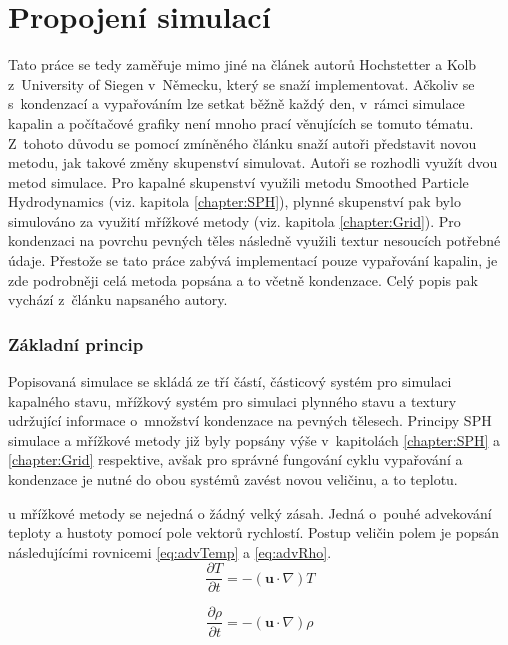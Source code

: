 \section{Propojení simulací}
\label{chapter:evap}
Tato práce se tedy zaměřuje mimo jiné na článek \cite{Evap&Cond} autorů Hochstetter a Kolb z~University of Siegen v~Německu, který se snaží implementovat. Ačkoliv se s~kondenzací a vypařováním lze setkat běžně každý den, v~rámci simulace kapalin a počítačové grafiky není mnoho prací věnujících se tomuto tématu. Z~tohoto důvodu se pomocí zmíněného článku snaží autoři představit novou metodu, jak takové změny skupenství simulovat. Autoři se rozhodli využít dvou metod simulace. Pro kapalné skupenství využili metodu Smoothed Particle Hydrodynamics (viz. kapitola \ref{chapter:SPH}), plynné skupenství pak bylo simulováno za využití mřížkové metody (viz. kapitola \ref{chapter:Grid}). Pro kondenzaci na povrchu pevných těles následně využili textur nesoucích potřebné údaje. Přestože se tato práce zabývá implementací pouze vypařování kapalin, je zde podrobněji celá metoda popsána a to včetně kondenzace. Celý popis pak vychází z~článku napsaného autory. \cite{Evap&Cond}

\subsubsection{Základní princip}
Popisovaná simulace se skládá ze tří částí, částicový systém pro simulaci kapalného stavu, mřížkový systém pro simulaci plynného stavu a textury udržující informace o~množství kondenzace na pevných tělesech. Principy SPH simulace a mřížkové metody již byly popsány výše v~kapitolách \ref{chapter:SPH} a \ref{chapter:Grid} respektive, avšak pro správné fungování cyklu vypařování a kondenzace je nutné do obou systémů zavést novou veličinu, a to teplotu.

u mřížkové metody se nejedná o žádný velký zásah. Jedná o~pouhé advekování teploty a hustoty pomocí pole vektorů rychlostí. Postup veličin polem je popsán následujícími rovnicemi \ref{eq:advTemp} a \ref{eq:advRho}.
\begin{equation}
	\frac{\partial T}{\partial t} = -(\mathbf{u} \cdot \nabla)T
	\label{eq:advTemp}
\end{equation}

\begin{equation}
	\frac{\partial \rho}{\partial t} = -(\mathbf{u} \cdot \nabla)\rho
	\label{eq:advRho}
\end{equation}

